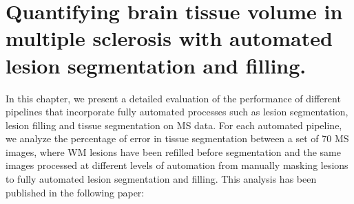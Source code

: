 
\chapter{Quantifying brain tissue volume in multiple sclerosis with automated lesion segmentation and filling.}  

\label{chapter:chapter_5}

In this chapter, we present a detailed evaluation of the performance of different pipelines that incorporate fully automated processes such as lesion segmentation, lesion filling and tissue segmentation on MS data. For each automated pipeline, we analyze the percentage of error in tissue segmentation between a set of 70 MS images, where WM lesions have been refilled before segmentation and the same images processed at different levels of automation from manually masking lesions to fully automated lesion segmentation and filling. This analysis has been published in the following paper:

\vspace{2cm}

\noindent{}





